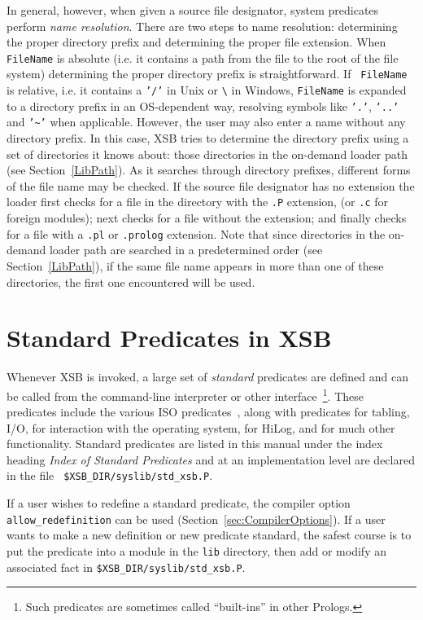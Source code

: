 In general, however, when given a source file designator, system
predicates perform {\em name resolution}.  There are two steps to name
resolution: determining the proper directory prefix and determining
the proper file extension.  When {\tt FileName} is absolute (i.e. it
contains a path from the file to the root of the file system)
determining the proper directory prefix is straightforward.  If {\tt
  FileName} is relative, i.e. it contains a {\tt '/'} in Unix or
\verb|\| in Windows, {\tt FileName} is expanded to a directory prefix
in an OS-dependent way, resolving symbols like {\tt '.'}, {\tt '..'}
and {\tt '\~{}'} when applicable.  However, the user may also enter a
name without any directory prefix. In this case, XSB tries to
determine the directory prefix using a set of directories it knows
about: those directories in the on-demand loader path (see
Section~\ref{LibPath}).  As it searches through directory prefixes,
different forms of the file name may be checked.  If the source file
designator has no extension the loader first checks for a file in the
directory with the {\tt .P} extension, (or {\tt .c} for foreign
modules); next checks for a file without the extension; and finally
checks for a file with a {\tt .pl} or {\tt .prolog} extension.  Note
that since directories in the on-demand loader path are searched in a
predetermined order (see Section~\ref{LibPath}), if the same file name
appears in more than one of these directories, the first one
encountered will be used.

 


\section{Standard Predicates in XSB} \label{sec:standard}

Whenever XSB is invoked, a large set of {\em standard} predicates are
defined and can be called from the command-line interpreter or other
interface~\footnote{Such predicates are sometimes called ``built-ins''
  in other Prologs.}.  These predicates include the various ISO
predicates~\cite{ISO-Prolog}, along with predicates for tabling, I/O,
for interaction with the operating system, for HiLog, and for much
other functionality.  Standard predicates are listed in this manual
under the index heading {\em Index of Standard Predicates} and at an
implementation level are declared in the file {\tt
  \$XSB\_DIR/syslib/std\_xsb.P}.

If a user wishes to redefine a standard predicate, the compiler option
{\tt allow\_redefinition} can be used
(Section~\ref{sec:CompilerOptions}).  If a user wants to make a new
definition or new predicate standard, the safest course is to put the
predicate into a module in the {\tt lib} directory, then add or modify
an associated fact in {\tt \$XSB\_DIR/syslib/std\_xsb.P}.

